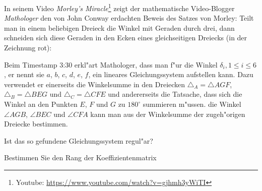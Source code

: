 In seinem Video {\em Morley's Miracle}\footnote{Youtube: \url{https://www.youtube.com/watch?v=gjhmh3yWiTI}}
zeigt der mathematische Video-Blogger
{\em Mathologer} den von John Conway erdachten Beweis des Satzes von Morley:
Teilt man in einem beliebigen Dreieck die Winkel mit Geraden durch drei, dann
schneiden sich diese Geraden in den Ecken eines gleichseitigen Dreiecks
(in der Zeichnung rot):
\begin{center}
\end{center}
Beim Timestamp 3:30 erkl"art Mathologer, dass man f"ur die Winkel
$\delta_i,1\le i\le 6$, er nennt sie $a$, $b$, $c$, $d$, $e$, $f$, ein
lineares Gleichungssystem aufstellen kann. 
Dazu verwendet er einerseits die Winkelsumme in den Dreiecken
$\triangle_A=\triangle AGF$,
$\triangle_B=\triangle BEG$ und $\triangle_C=\triangle CFE$
und andererseits die Tatsache, dass sich die
Winkel an den Punkten $E$, $F$ und $G$ zu $180^\circ$ summieren m"ussen.
die Winkel $\angle AGB$, $\angle BEC$ und $\angle CFA$ kann man aus
der Winkelsumme der zugeh"origen Dreiecke bestimmen.
\begin{teilaufgaben}
\item
Ist das so gefundene Gleichungssystem regul"ar?
\item
Bestimmen Sie den Rang der Koeffizientenmatrix
\end{teilaufgaben}

